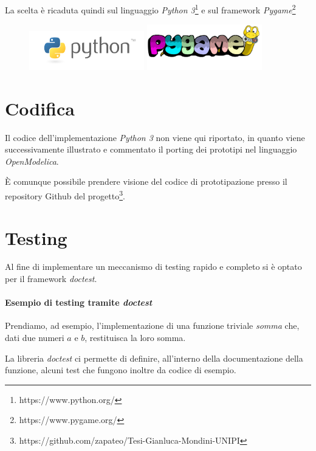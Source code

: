 \documentclass[11pt,a4paper]{report}
\begin{document}
La scelta è ricaduta quindi sul linguaggio \textit{Python 3}\footnote{https://www.python.org/} e sul framework \textit{Pygame}\footnote{https://www.pygame.org/}

\begin{figure}[H]
\centering
\includegraphics[width=5cm]{python.png}
\includegraphics[width=5cm]{pygame.png}

\end{figure}

\section{Codifica}

Il codice dell'implementazione \textit{Python 3} non viene qui riportato, in quanto viene successivamente illustrato e commentato il porting dei prototipi nel linguaggio \textit{OpenModelica}.

È comunque possibile prendere visione del codice di prototipazione presso il repository Github del progetto\footnote{https://github.com/zapateo/Tesi-Gianluca-Mondini-UNIPI}.


\section{Testing}

Al fine di implementare un meccanismo di testing rapido e completo si è optato per il framework \textit{doctest}.

\paragraph{Esempio di testing tramite \textit{doctest}}

Prendiamo, ad esempio, l'implementazione di una funzione triviale \textit{somma} che, dati due numeri $a$ e $b$, restituisca la loro somma.

La libreria \textit{doctest} ci permette di definire, all'interno della documentazione della funzione, alcuni test che fungono inoltre da codice di esempio.
\end{document}
